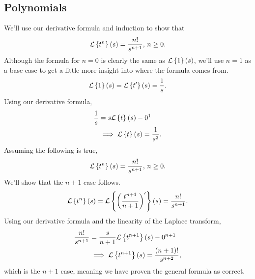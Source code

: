 \subsection{Polynomials}
\noindent
We'll use our derivative formula and induction to show that
\begin{equation*}
	\mathcal{L}\left\{ t^n \right\}\left(s\right) = \frac{n!}{s^{n+1}} \text{, } n \geq 0.
\end{equation*}
Although the formula for $n = 0$ is clearly the same as $\mathcal{L}\left\{ 1 \right\}\left(s\right)$, we'll use $n = 1$ as a base case to get a little more insight into where the formula comes from.\\
\begin{equation*}
	\mathcal{L}\left\{ 1 \right\}\left(s\right) = \mathcal{L}\left\{ t' \right\}\left(s\right) = \frac{1}{s}.
\end{equation*}
Using our derivative formula,
\begin{align*}
	\frac{1}{s} &= s\mathcal{L}\left\{ t \right\}\left(s\right) - 0^{1} \\
	&\implies \mathcal{L}\left\{ t \right\}\left(s\right) = \frac{1}{s^2}.
\end{align*}
Assuming the following is true,
\begin{equation*}
	\mathcal{L}\left\{ t^n \right\}\left(s\right) = \frac{n!}{s^{n+1}} \text{, } n \geq 0.
\end{equation*}
We'll show that the $n+1$ case follows.
\begin{equation*}
	\mathcal{L}\left\{ t^n \right\}\left(s\right) = \mathcal{L}\left\{ \left(\frac{t^{n+1}}{n+1}\right)' \right\}\left(s\right) = \frac{n!}{s^{n+1}}.
\end{equation*}
Using our derivative formula and the linearity of the Laplace transform,
\begin{align*}
	\frac{n!}{s^{n+1}} &= \frac{s}{n+1}\mathcal{L}\left\{ t^{n+1} \right\}\left(s\right) - 0^{n+1} \\
	&\implies \mathcal{L}\left\{ t^{n+1} \right\}\left(s\right) = \frac{(n+1)!}{s^{n+2}},
\end{align*}
which is the $n+1$ case, meaning we have proven the general formula as correct.